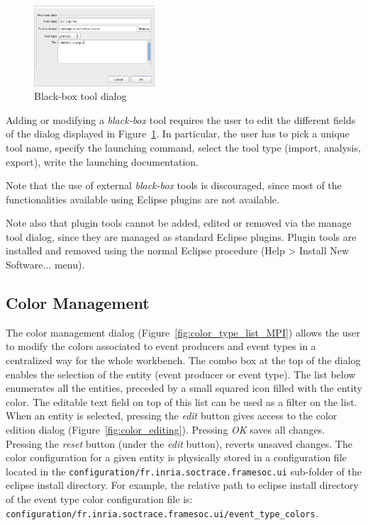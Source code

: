 \documentclass[twoside]{article}
\begin{document}
\begin{sloppypar}
\begin{figure}[h!]
  \centering
    \includegraphics[width=0.4\textwidth]{images/blackbox.png}
  \caption{Black-box tool dialog}
  \label{fig:blackbox}
\end{figure}

Adding or modifying a \emph{black-box} tool requires the user to edit the different fields of the dialog displayed in Figure~\ref{fig:blackbox}.
In particular, the user has to pick a unique tool name, specify the launching command, select the tool type (import, analysis, export), write the launching documentation.

Note that the use of external \emph{black-box} tools is discouraged, since most of the functionalities available using Eclipse plugins are not available.

Note also that plugin tools cannot be added, edited or removed via the manage tool dialog, since they are managed as standard Eclipse plugins.
Plugin tools are installed and removed using the normal Eclipse procedure (Help > Install New Software... menu). 

\subsection{Color Management}
\label{subsec:colors}

The color management dialog (Figure~\ref{fig:color_type_list_MPI}) allows the user to modify the colors associated to event producers and event types in a centralized way for the whole workbench.
The combo box at the top of the dialog enables the selection of the entity (event producer or event type).
The list below enumerates all the entities, preceded by a small squared icon filled with the entity color.
The editable text field on top of this list can be used as a filter on the list.
When an entity is selected, pressing the \emph{edit} button gives access to the color edition dialog (Figure~\ref{fig:color_editing}).
Pressing \emph{OK} saves all changes.
Pressing the \emph{reset} button (under the \emph{edit} button), reverts unsaved changes.
The color configuration for a given entity is physically stored in a configuration file located in the \texttt{configuration/fr.inria.soctrace.framesoc.ui} sub-folder of the eclipse install directory.
For example, the relative path to eclipse install directory of the event type color configuration file is:
\texttt{configuration/fr.inria.soctrace.framesoc.ui/event\_type\_colors}.


\end{sloppypar}
\end{document}
